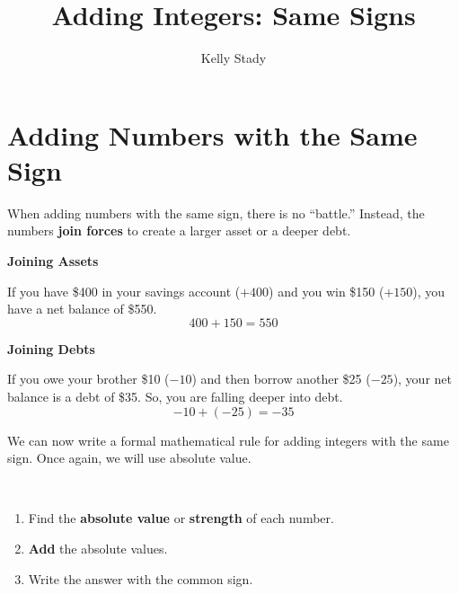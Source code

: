 \documentclass{ximera}[font=12pt]
\title{Adding Integers: Same Signs}   %
\author{Kelly Stady}
\begin{document}
\begin{abstract}

\end{abstract}

\maketitle
\label{xim:AddIntSameSActivity}


\section*{Adding Numbers with the Same Sign}

When adding numbers with the same sign, there is no ``battle.'' Instead, the numbers \textbf{join forces} to create a larger 
asset or a deeper debt.

\begin{example} \textbf{Joining Assets}

If you have \$400 in your savings account ($+400$) and you win \$150 ($+150$), you have a net balance of \$550.
\[ 400 + 150 = 550 \]

\end{example}

\begin{example} \textbf{Joining Debts}

If you owe your brother \$10 ($-10$) and then borrow another \$25 ($-25$), your net balance is a debt of \$35.  So, you are falling deeper into debt.
\[ -10 + (-25) = -35 \]

\end{example}


We can now write a formal mathematical rule for adding integers with the same sign.  Once again, we will use absolute value.


\begin{procedure}

    ~ \\[2pt]
\begin{enumerate} 
    \item Find the \textbf{absolute value} or \textbf{strength} of each number.

     \item \textbf{Add} the absolute values.

     \item Write the answer with the common sign.
\end{enumerate}
\end{procedure}
\end{document}
